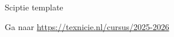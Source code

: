 \begin{frame}{Sciptie template}
    

    Ga naar \url{https://texnicie.nl/cursus/2025-2026}
    


\end{frame}